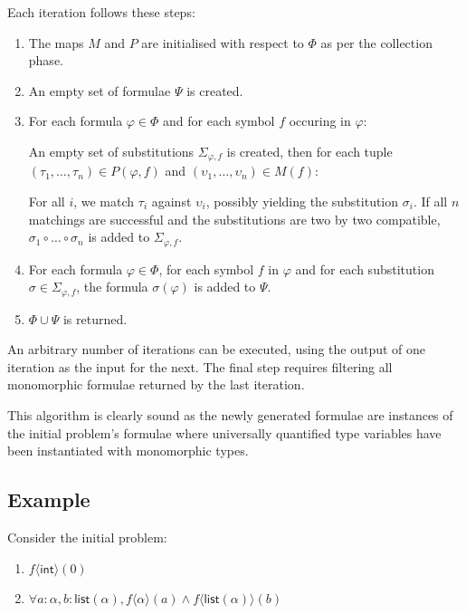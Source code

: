 \documentclass[]{ceurart}
\newcommand\ty[1]{\textsf{#1}}
\begin{document}
Each iteration follows these steps:
\begin{enumerate}

   \item The maps \(M\) and \(P\) are initialised with respect to \(\Phi\) as per the collection phase.

   \item An empty set of formulae \(\Psi\) is created.

   \item For each formula \(\varphi \in \Phi\) and for each symbol \(f\) occuring in \(\varphi\):

      An empty set of substitutions \(\Sigma_{\varphi, f}\) is created, then for each tuple \((\tau_1, \dots, \tau_n) \in  P(\varphi, f)\) and \((\upsilon_1, \dots, \upsilon_n) \in M(f)\):

      For all \(i\), we match \(\tau_i\) against \(\upsilon_i\), possibly yielding the substitution \(\sigma_i\). If all \(n\) matchings are successful and the substitutions are two by two compatible, \(\sigma_1 \circ \dots \circ \sigma_n\) is added to \(\Sigma_{\varphi, f}\).

   \item For each formula \(\varphi \in \Phi\), for each symbol \(f\) in \(\varphi\) and for each substitution \(\sigma \in \Sigma_{\varphi, f}\), the formula \(\sigma(\varphi)\) is added to \(\Psi\).

   \item \(\Phi \cup \Psi\) is returned.

\end{enumerate}


An arbitrary number of iterations can be executed, using the output of one iteration as the input for the next. The final step requires filtering all monomorphic formulae returned by the last iteration.

This algorithm is clearly sound as the newly generated formulae are instances of the initial problem's formulae where universally quantified type variables have been instantiated with monomorphic types.

\subsection{Example}

Consider the initial problem:
\begin{enumerate}
   \item \(f\langle \ty{int}\rangle(0)\)
   \item \(\forall a: \alpha, b:\ty{list}(\alpha), f\langle\alpha\rangle(a) \land f\langle \ty{list}(\alpha)\rangle(b)\)
\end{enumerate}
\end{document}
